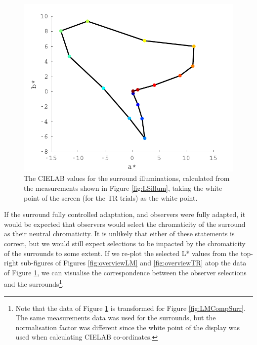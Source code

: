 \begin{figure}[htbp]
\includegraphics[max width=\textwidth]{figs/LargeSphere/adapter1.pdf}
\caption{The CIELAB values for the surround illuminations, calculated from the measurements shown in Figure \ref{fig:LSillum}, taking the white point of the screen (for the TR trials) as the white point.}
\label{fig:adapter1}
\end{figure}

If the surround fully controlled adaptation, and observers were fully adapted, it would be expected that observers would select the chromaticity of the surround as their neutral chromaticity. It is unlikely that either of these statements is correct, but we would still expect selections to be impacted by the chromaticity of the surrounds to some extent. If we re-plot the selected L* values from the top-right sub-figures of Figures \ref{fig:overviewLM} and \ref{fig:overviewTR} atop the data of Figure \ref{fig:adapter1}, we can visualise the correspondence between the observer selections and the surrounds\footnote{Note that the data of Figure \ref{fig:adapter1} is transformed for Figure \ref{fig:LMCompSurr}. The same measurements data was used for the surrounds, but the normalisation factor was different since the white point of the display was used when calculating CIELAB co-ordinates.}.

